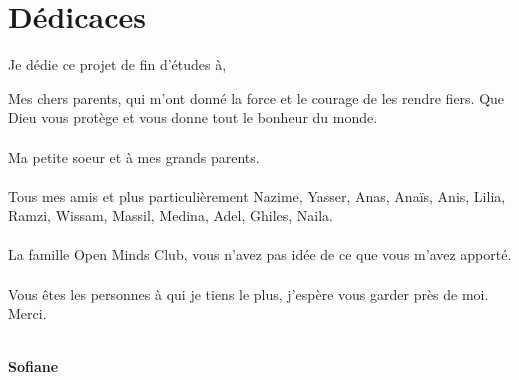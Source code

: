 \chapter*{Dédicaces} %

Je dédie ce projet de fin d'études à, 

Mes chers parents, qui m'ont donné la force et le courage de les rendre fiers. Que Dieu vous protège et vous donne tout le bonheur du monde. \\ \\
Ma petite soeur et à mes grands parents. \\ \\
Tous mes amis et plus particulièrement Nazime, Yasser, Anas, Anaïs, Anis, Lilia, Ramzi, Wissam, Massil, Medina, Adel, Ghiles, Naila.\\ \\
La famille Open Minds Club, vous n'avez pas idée de ce que vous m'avez apporté.\\ \\
Vous êtes les personnes à qui je tiens le plus, j'espère vous garder près de moi. Merci. \\ \\

\vspace{0.5cm}
\begin{center}
\Large
\hspace{12.5cm}
\textbf{Sofiane}
\end{center}
